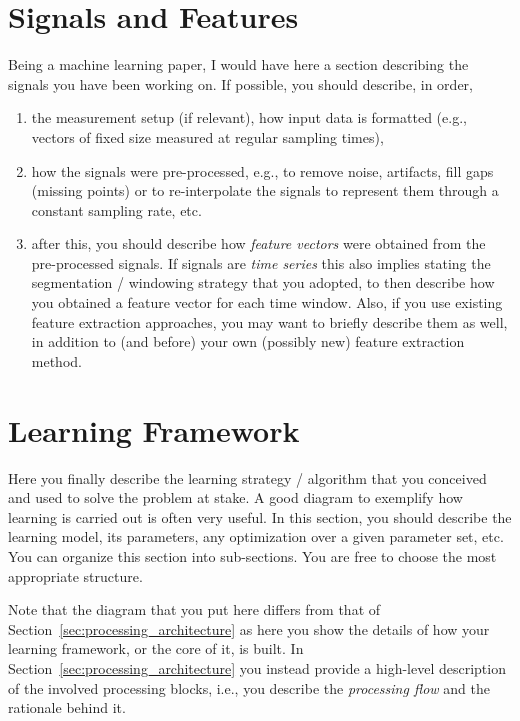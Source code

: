 \section{Signals and Features}
\label{sec:model}

Being a machine learning paper, I would have here a section describing the signals you have been working on. If possible, you should describe, in order, 
\begin{enumerate}
\item the measurement setup (if relevant), how input data is formatted (e.g., vectors of fixed size measured at regular sampling times), 
\item how the signals were \mbox{pre-processed}, e.g., to remove noise, artifacts, fill gaps (missing points) or to re-interpolate the signals to represent them through a constant sampling rate, etc.
\item after this, you should describe how {\it feature vectors} were obtained from the \mbox{pre-processed} signals. If signals are {\it time series} this also implies stating the segmentation / windowing strategy that you adopted, to then describe how you obtained a feature vector for each time window. Also, if you use existing feature extraction approaches, you may want to briefly describe them as well, in addition to (and before) your own (possibly new) feature extraction method.
\end{enumerate}


\section{Learning Framework}
\label{sec:learning_framework}

Here you finally describe the learning strategy / algorithm that you conceived and used to solve the problem at stake. A good diagram to exemplify how learning is carried out is often very useful. In this section, you should describe the learning model, its parameters, any optimization over a given parameter set, etc. You can organize this section into \mbox{sub-sections}. You are free to choose the most appropriate structure.

\begin{remark}
Note that the diagram that you put here differs from that of Section~\ref{sec:processing_architecture} as here you show the details of how your learning framework, or the core of it, is built. In Section~\ref{sec:processing_architecture} you instead provide a high-level description of the involved processing blocks, i.e., you describe the {\it processing flow} and the rationale behind it.
\end{remark}

